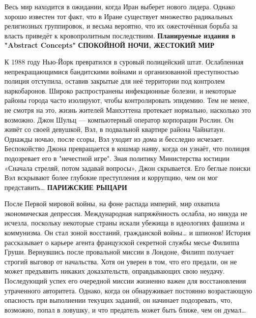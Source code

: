 \documentclass[a4paper,12pt]{book}
\begin{document}
\par
Весь мир находится в ожидании, когда Иран выберет нового лидера. Однако хорошо известен тот факт, что в Иране существует множество радикальных религиозных группировок, и весьма вероятно, что их ожесточённая борьба за власть приведёт к кровопролитным последствиям.
\newpage
{}
\noindent
\textbf{Планируемые издания в "Abstract Concepts"}
\newline
\newline
\newline
\newline
\textbf{СПОКОЙНОЙ НОЧИ, ЖЕСТОКИЙ МИР}\\
\par
К 1988 году Нью-Йорк превратился в суровый полицейский штат. Ослабленная непрекращающимися бандитскими войнами и организованной преступностью полиция отступила, оставив закрытые для неё территории под контролем наркобаронов. Широко распространены инфекционные болезни, и некоторые районы города часто изолируют, чтобы контролировать эпидемию. Тем не менее, не смотря на это, жизнь жителей Манхэттена протекает нормально, насколько это возможно.
Джон Шульц — компьютерный оператор корпорации Рослин. Он живёт со своей девушкой, Вэл, в подвальной квартире района Чайнатаун.
Однажды ночью, после ссоры, Вэл уходит из дома и бесследно исчезает. Беспокойство Джона превращается в кошмар наяву, когда он узнаёт, что полиция подозревает его в "нечестной игре". Зная политику Министерства юстиции «Сначала стреляй, потом задавай вопросы», Джон скрывается.
Его беглые поиски Вэл вскрывают более глубокие преступления и коррупцию, чем он мог представить…
\newline
\newline
\newline
\textbf{ПАРИЖСКИЕ РЫЦАРИ}\\
\par
После Первой мировой войны, на фоне распада империй, мир охватила экономическая депрессия. Международная напряжённость ослабла, но никуда не исчезла, поскольку некоторые страны искали убежища в идеологиях фашизма и коммунизма.
Он стал зоной восстаний, гражданской войны… и шпионов!
История рассказывает о карьере агента французской секретной службы месье Филиппа Груши. Вернувшись после провальной миссии в Лондоне, Филипп получает строгий выговор от начальства. Хотя он уверен в том, что его предали, он не может предъявить никаких доказательств, оправдывающих свою неудачу. Последующий успех его очередной миссии жизненно важен для восстановления утраченного авторитета. Однако, когда он обнаруживает постоянно возрастающую опасность при выполнении текущих заданий, он начинает подозревать, что, возможно, попал в ловушку, и что предатель может быть ближе, чем он думал…
\end{document}
